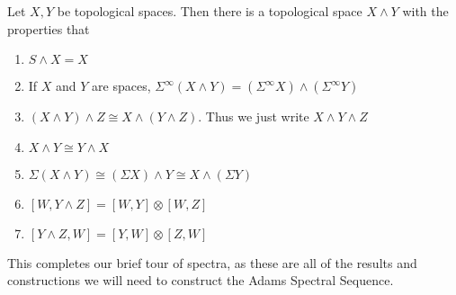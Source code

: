 \begin{Theorem}
  Let $X,Y$ be topological spaces.  Then there is a topological space $X\wedge Y$ with the properties that
  \begin{enumerate}
    \item $S\wedge X=X$
    \item If $X$ and $Y$ are spaces, $\Sigma^\infty(X\wedge Y)=(\Sigma^\infty X)\wedge (\Sigma^\infty Y)$
    \item $(X\wedge Y)\wedge Z\cong X\wedge (Y\wedge Z)$.  
      Thus we just write $X\wedge Y\wedge Z$
    \item  $X\wedge Y\cong Y\wedge X$
    \item  $\Sigma(X\wedge Y)\cong(\Sigma X)\wedge Y\cong X\wedge (\Sigma Y)$
    \item $[W,Y\wedge Z]=[W,Y]\otimes [W,Z]$
    \item $[Y\wedge Z,W]=[Y,W]\otimes [Z,W]$
  \end{enumerate}
\end{Theorem}


This completes our brief tour of spectra, as these are all of the results and constructions we will need to construct the Adams Spectral Sequence.  


